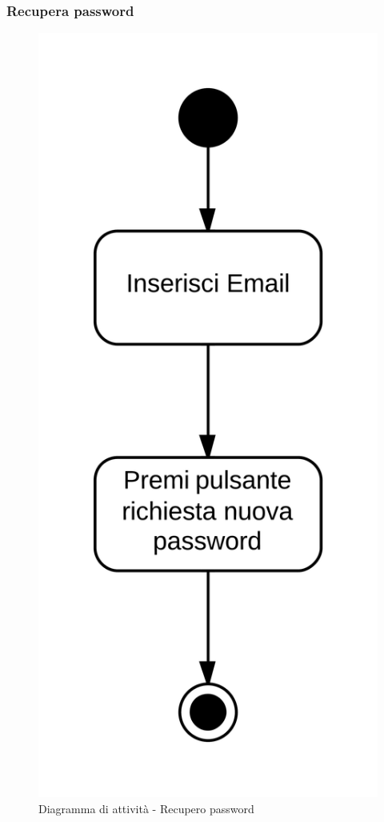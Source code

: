 \subsubsection{Recupera password}

\begin{figure}[H]
\centering
\includegraphics[scale=0.05]{uml/MaaP - Recupera password.png}
\caption{Diagramma di attività - Recupero password}
\end{figure}

